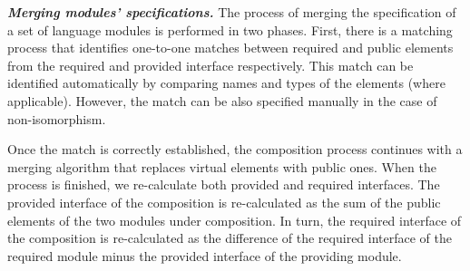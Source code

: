 


\vspace{2mm}
\textit{\textbf{Merging modules' specifications.}} The process of merging the specification of a set of language modules is performed in two phases. First, there is a matching process that identifies one-to-one matches between required and public elements from the required and provided interface respectively. This match can be identified automatically by comparing names and types of the elements (where applicable). However, the match can be also specified manually in the case of non-isomorphism.

Once the match is correctly established, the composition process continues with a merging algorithm that replaces virtual elements with public ones. When the process is finished, we re-calculate both provided and required interfaces. The provided interface of the composition is re-calculated as the sum of the public elements of the two modules under composition. In turn, the required interface of the composition is re-calculated as the difference of the required interface of the required module minus the provided interface of the providing module. 

